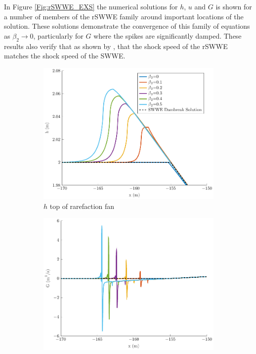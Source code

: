 \documentclass[10pt]{elsarticle}
\begin{document}
In Figure \ref{Fig:rSWWE_EXS} the numerical solutions for $h$, $u$ and $G$ is shown for a number of members of the rSWWE family around important locations of the solution. These solutions demonstrate the convergence of this family of equations as $\beta_2 \rightarrow 0$, particularly for $G$ where the spikes are significantly damped. These results also verify that as shown by \cite{Dutykh-etal-2018-371}, that the shock speed of the rSWWE matches the shock speed of the SWWE.
%
\begin{figure}
	\centering
	\begin{subfigure}{0.32\textwidth}
		\centering
		\includegraphics[width=\textwidth]{./Figures/Simulations/Study/RegSWWE/Convergence/hRFtop.pdf}
		\caption{$h$ top of rarefaction fan}
	\end{subfigure}
	\begin{subfigure}{0.32\textwidth}
		\centering
		\includegraphics[width=\textwidth]{./Figures/Simulations/Study/RegSWWE/Convergence/GRFtop.pdf}

\end{subfigure}
\end{figure}
\end{document}
